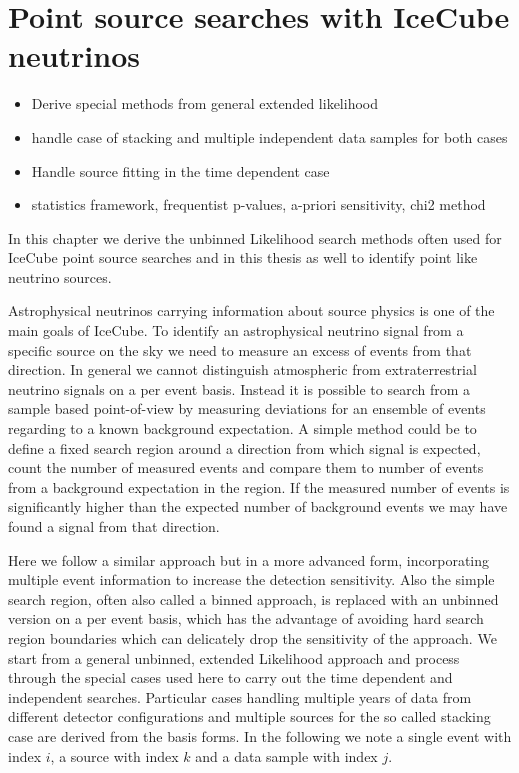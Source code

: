 \chapter{Point source searches with IceCube neutrinos}



\begin{itemize}
  \item Derive special methods from general extended likelihood
  \item handle case of stacking and multiple independent data samples for both cases
  \item Handle source fitting in the time dependent case
  \item statistics framework, frequentist p-values, a-priori sensitivity, chi2 method
\end{itemize}

In this chapter we derive the unbinned Likelihood search methods often used for IceCube point source searches and in this thesis as well to identify point like neutrino sources.

Astrophysical neutrinos carrying information about source physics is one of the main goals of IceCube.
To identify an astrophysical neutrino signal from a specific source on the sky we need to measure an excess of events from that direction.
In general we cannot distinguish atmospheric from extraterrestrial neutrino signals on a per event basis.
Instead it is possible to search from a sample based point-of-view by measuring deviations for an ensemble of events regarding to a known background expectation.
A simple method could be to define a fixed search region around a direction from which signal is expected, count the number of measured events and compare them to number of events from a background expectation in the region.
If the measured number of events is significantly higher than the expected number of background events we may have found a signal from that direction.

Here we follow a similar approach but in a more advanced form, incorporating multiple event information to increase the detection sensitivity.
Also the simple search region, often also called a binned approach, is replaced with an unbinned version on a per event basis, which has the advantage of avoiding hard search region boundaries which can delicately drop the sensitivity of the approach.
We start from a general unbinned, extended Likelihood approach and process through the special cases used here to carry out the time dependent and independent searches.
Particular cases handling multiple years of data from different detector configurations and multiple sources for the so called stacking case are derived from the basis forms.
In the following we note a single event with index $i$, a source with index $k$ and a data sample with index $j$.

